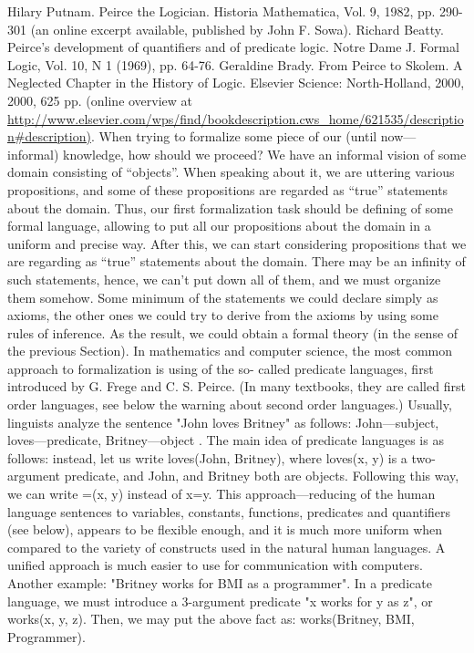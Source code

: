Hilary Putnam. Peirce the Logician. Historia Mathematica, Vol. 9, 1982, pp. 290-301 (an online excerpt available, published
by John F. Sowa).
Richard Beatty. Peirce's development of quantifiers and of predicate logic. Notre Dame J. Formal Logic, Vol. 10, N 1 (1969),
pp. 64-76.
Geraldine Brady. From Peirce to Skolem. A Neglected Chapter in the History of Logic. Elsevier Science: North-Holland, 2000,
2000, 625 pp. (online overview at
\url{http://www.elsevier.com/wps/find/bookdescription.cws\_home/621535/description#description)}.
When trying to formalize some piece of our (until now---informal) knowledge, how should we proceed?
We have an informal vision of some domain consisting of ``objects''. When speaking about it, we are
uttering various propositions, and some of these propositions are regarded as ``true'' statements about the
domain.
Thus, our first formalization task should be defining of some formal language, allowing to put all our
propositions about the domain in a uniform and precise way.
After this, we can start considering propositions that we are regarding as ``true'' statements about the
domain. There may be an infinity of such statements, hence, we can't put down all of them, and we must
organize them somehow. Some minimum of the statements we could declare simply as axioms, the other
ones we could try to derive from the axioms by using some rules of inference.
As the result, we could obtain a formal theory (in the sense of the previous Section).
In mathematics and computer science, the most common approach to formalization is using of the so-
called predicate languages, first introduced by G. Frege and C. S. Peirce.
(In many textbooks, they are called first order languages, see below the warning about second order languages.)
Usually, linguists analyze the sentence "John loves Britney" as follows: John---subject, loves---predicate,
Britney---object . The main idea of predicate languages is as follows: instead, let us write loves(John,
Britney), where loves(x, y) is a two-argument predicate, and John, and Britney both are objects. Following
this way, we can write =(x, y) instead of x=y. This approach---reducing of the human language sentences
to variables, constants, functions, predicates and quantifiers (see below), appears to be flexible enough,
and it is much more uniform when compared to the variety of constructs used in the natural human
languages. A unified approach is much easier to use for communication with computers.
Another example: "Britney works for BMI as a programmer". In a predicate language, we must introduce a 3-argument
predicate "x works for y as z", or works(x, y, z). Then, we may put the above fact as: works(Britney, BMI, Programmer).
